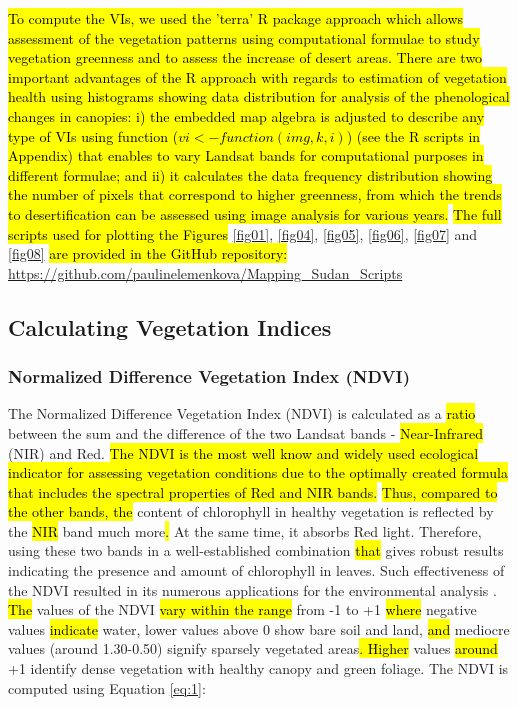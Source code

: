 \documentclass[jimaging,article,submit,pdftex,moreauthors]{Definitions/mdpi}
\begin{document}
\hl{To compute the VIs, we used the 'terra' R package approach which allows assessment of the vegetation patterns using computational formulae to study vegetation greenness and to assess the increase of desert areas. There are two important advantages of the R approach with regards to estimation of vegetation health using histograms showing data distribution for analysis of the phenological changes in canopies: i) the embedded map algebra is adjusted to describe any type of VIs using function ($vi <- function(img, k, i)$) (see the R scripts in Appendix) that enables to vary Landsat bands for computational purposes in different formulae; and ii) it calculates the data frequency distribution showing the number of pixels that correspond to higher greenness, from which the trends to desertification can be assessed using image analysis for various years.} \hl{The full scripts used for plotting the Figures }\ref{fig01}, \ref{fig04}, \ref{fig05}, \ref{fig06}, \ref{fig07} and \ref{fig08} \hl{are provided in the GitHub repository:} \href{https://github.com/paulinelemenkova/Mapping_Sudan_Scripts}{https://github.com/paulinelemenkova/Mapping\_Sudan\_Scripts}

\subsection{Calculating Vegetation Indices}

\subsubsection{Normalized Difference Vegetation Index (NDVI)}
The Normalized Difference Vegetation Index (NDVI) \cite{Rouse} is calculated as a \hl{ratio} between the sum and the difference of the two Landsat bands - \hl{Near-Infrared} (NIR) and Red. \hl{The NDVI is the most well know and widely used ecological indicator for assessing vegetation conditions due to the optimally created formula that includes the spectral properties of Red and NIR bands. }\hl{Thus, compared to the other bands, the} content of chlorophyll in healthy vegetation is reflected by the \hl{NIR} band much more\hl{. }At the same time, it absorbs Red light. Therefore, using these two bands in a well-established combination \hl{that }gives robust results indicating the presence and amount of chlorophyll in leaves. Such effectiveness of the NDVI resulted in its numerous applications for the environmental analysis \cite{w13192707,rs12244119,GHEBREZGABHER2020249,RULINDA2012169}. \hl{The} values of the NDVI \hl{vary within the range} from -1 to +1 \hl{where} negative values \hl{indicate} water, lower values above 0 show bare soil and land, \hl{and }mediocre values (around 1.30-0.50) signify sparsely vegetated areas\hl{. Higher }values \hl{around} +1 identify dense vegetation with healthy canopy and green foliage. The NDVI is computed using Equation \ref{eq:1}:
\end{document}
